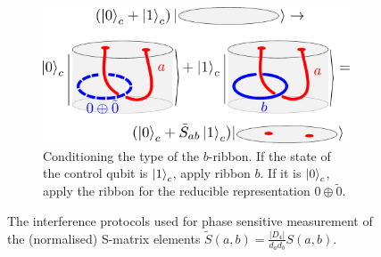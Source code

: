 \documentclass[a4paper,twocolumn,11pt, accepted=2024-06-14]{quantumarticle}
\begin{document}
\begin{figure}
\begin{subfigure}{0.47\textwidth}
    \includegraphics[width=\linewidth]{Figures/intefFlav.pdf}
    \caption{Conditioning the type of the $b$-ribbon. If the state of the control qubit is $\ket{1}_c$, apply ribbon $b$. If it is $\ket{0}_c$, apply the ribbon for the reducible representation $0\oplus\tilde{0}$.}
    \label{fig:cond_flav}
\end{subfigure}

\caption{The interference protocols used for phase sensitive measurement of the (normalised) S-matrix elements  $\tilde{S}(a,b) = \frac{|D_4|}{d_a d_b}S(a,b)$.	}
\label{fig:S-mat}
\end{figure}
\end{document}
